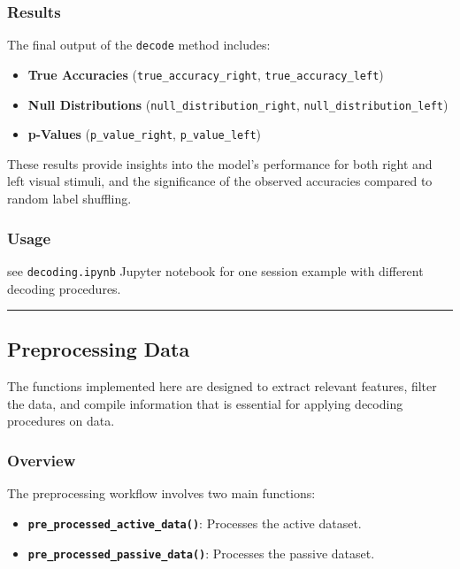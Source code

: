 \documentclass[
  letterpaper,
  DIV=11,
  numbers=noendperiod]{scrartcl}
\providecommand{\tightlist}{%
  \setlength{\itemsep}{0pt}\setlength{\parskip}{0pt}}\usepackage{longtable,booktabs,array}
\begin{document}
\subsubsection{Results}\label{results}

The final output of the \texttt{decode} method includes:

\begin{itemize}
\tightlist
\item
  \textbf{True Accuracies} (\texttt{true\_accuracy\_right},
  \texttt{true\_accuracy\_left})
\item
  \textbf{Null Distributions} (\texttt{null\_distribution\_right},
  \texttt{null\_distribution\_left})
\item
  \textbf{p-Values} (\texttt{p\_value\_right}, \texttt{p\_value\_left})
\end{itemize}

These results provide insights into the model's performance for both
right and left visual stimuli, and the significance of the observed
accuracies compared to random label shuffling.

\subsubsection{Usage}\label{usage}

see \texttt{decoding.ipynb} Jupyter notebook for one session example
with different decoding procedures.

\begin{center}\rule{0.5\linewidth}{0.5pt}\end{center}

\subsection{Preprocessing Data}\label{preprocessing-data}

The functions implemented here are designed to extract relevant
features, filter the data, and compile information that is essential for
applying decoding procedures on data.

\subsubsection{Overview}\label{overview}

The preprocessing workflow involves two main functions:

\begin{itemize}
\tightlist
\item
  \textbf{\texttt{pre\_processed\_active\_data()}}: Processes the active
  dataset.
\item
  \textbf{\texttt{pre\_processed\_passive\_data()}}: Processes the
  passive dataset.
\end{itemize}
\end{document}
